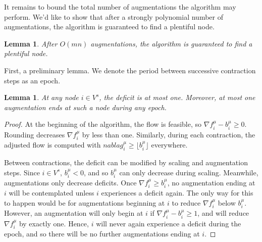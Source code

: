 \documentclass[11pt]{article}
\newtheorem{lemma}[theorem]{Lemma}
\theoremstyle{definition}
\theoremstyle{definition}
\theoremstyle{definition}
\newcommand{\fu}{f^{\mu}}
\newcommand{\nfiu}{\nabla \fu_i}
\newcommand{\biu}{b_{i}^{\mu}}
\newcommand{\vsrc}{V^{s}}
\begin{document}
    It remains to bound the total number of augmentations the algorithm may perform. We'd
    like to show that after a strongly polynomial number of augmentations, the algorithm
    is guaranteed to find a plentiful node.

    \begin{lemma} \label{lem.num-aug}
        After $O(mn)$ augmentations, the algorithm is guaranteed to find a plentiful node.
    \end{lemma}
    First, a preliminary lemma. We denote the period between successive contraction
    steps as an epoch.
    \begin{lemma} \label{lem:deficit-bound}
    At any node $i \in \vsrc$, the deficit is at most one. Moreover, at most one augmentation
    ends at such a node during any epoch.
    \end{lemma}
    \begin{proof}
        At the beginning of the algorithm, the flow is feasible, so $\nfiu - \biu \geq 0$.
        Rounding decreases $\nfiu$ by less than one. Similarly, during each contraction,
        the adjusted flow is computed with $nabla g_i^\mu \geq \lfloor \biu \rfloor$ everywhere.

        Between contractions, the deficit can be modified by scaling and augmentation steps.
        Since $i \in \vsrc$, $\biu < 0$, and so $\biu$ can only decrease during scaling.
        Meanwhile, augmentations only decrease deficits.
        Once $\nfiu \geq \biu$, no augmentation ending at $i$ will be contemplated unless $i$
        experiences a deficit again. The only way for this to happen would be for
        augmentations beginning at $i$ to reduce $\nfiu$ below $\biu$. However,
        an augmentation will only begin at $i$ if
        $\nfiu - \biu \geq 1$, and will reduce $\nfiu$ by exactly one. Hence, $i$ will
        never again experience a deficit during the epoch, and so there will be no further
        augmentations ending at $i$.
    \end{proof}
\end{document}
